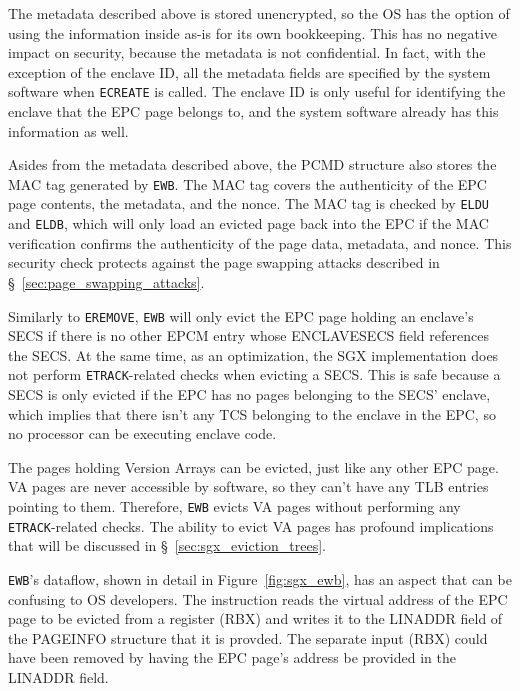 The metadata described above is stored unencrypted, so the OS has the option of
using the information inside as-is for its own bookkeeping. This has no
negative impact on security, because the metadata is not confidential. In fact,
with the exception of the enclave ID, all the metadata fields are specified by
the system software when \texttt{ECREATE} is called. The enclave ID is only
useful for identifying the enclave that the EPC page belongs to, and the system
software already has this information as well.

Asides from the metadata described above, the PCMD structure also stores the
MAC tag generated by \texttt{EWB}. The MAC tag covers the authenticity of the
EPC page contents, the metadata, and the nonce. The MAC tag is checked by
\texttt{ELDU} and \texttt{ELDB}, which will only load an evicted page back into
the EPC if the MAC verification confirms the authenticity of the page data,
metadata, and nonce. This security check protects against the page swapping
attacks described in \S~\ref{sec:page_swapping_attacks}.


Similarly to \texttt{EREMOVE}, \texttt{EWB} will only evict the EPC page
holding an enclave's SECS if there is no other EPCM entry whose ENCLAVESECS
field references the SECS. At the same time, as an optimization, the SGX
implementation does not perform \texttt{ETRACK}-related checks when evicting a
SECS. This is safe because a SECS is only evicted if the EPC has no pages
belonging to the SECS' enclave, which implies that there isn't any TCS
belonging to the enclave in the EPC, so no processor can be executing enclave
code.


The pages holding Version Arrays can be evicted, just like any other EPC page.
VA pages are never accessible by software, so they can't have any TLB entries
pointing to them. Therefore, \texttt{EWB} evicts VA pages without performing
any \texttt{ETRACK}-related checks. The ability to evict VA pages has profound
implications that will be discussed in \S~\ref{sec:sgx_eviction_trees}.

\texttt{EWB}'s dataflow, shown in detail in Figure~\ref{fig:sgx_ewb}, has an
aspect that can be confusing to OS developers. The instruction reads the
virtual address of the EPC page to be evicted from a register (RBX) and writes
it to the LINADDR field of the PAGEINFO structure that it is provded. The
separate input (RBX) could have been removed by having the EPC page's address
be provided in the LINADDR field.

